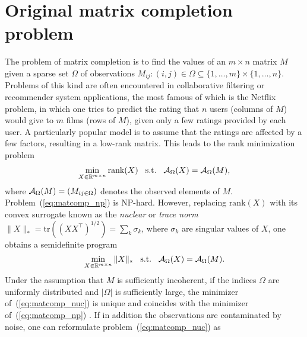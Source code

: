 \documentclass{article}
\begin{document}
\section{Original matrix completion problem}
\label{secMatCom}
\vspace{-0.2cm}
The problem of matrix completion is to find the values of an $m\times n$ matrix $M$ given a sparse set $\Omega$ of observations $M_{ij} : (i,j) \in \Omega \subseteq \{1,\hdots, m\} \times \{1, \hdots, n\}$. 
Problems of this kind are often encountered in collaborative filtering or recommender system applications, the most famous of which is the Netflix problem, in which one tries to predict the rating that $n$ users (columns of $M$) would give to $m$ films (rows of $M$), given only a few ratings provided by each user. 
A particularly popular model is to assume that the ratings are affected by a few factors, resulting in a low-rank matrix. 
This leads to the rank minimization problem 
\vspace{-0.1cm} 
\begin{eqnarray}
\min_{X \in \mathbb{R}^{m\times n}} 			 \text{rank}(X)   \hspace{3mm} \text{s.t.} \hspace{3mm} {\cal A}_{\Omega}(X) = {\cal A}_{\Omega}(M), 
\label{eq:matcomp_np}
\end{eqnarray}
where ${\cal A}_{\Omega}(M) = (M_{ij \in \Omega})$ denotes the observed elements of $M$. Problem~(\ref{eq:matcomp_np}) is NP-hard. However, replacing $\text{rank}(X)$ with its convex surrogate known as the {\em nuclear} or {\em trace norm} \cite{srebro2004maximum}  $\| X\|_* = \mathrm{tr}((XX^\top)^{1/2}) = \sum_{k} \sigma_k$, where $\sigma_k$ are singular values of $X$, one obtains a semidefinite program 
\vspace{-0.1cm}
\begin{eqnarray}
\min_{X \in \mathbb{R}^{m\times n}} 			 \|X\|_*    \hspace{3mm} \text{s.t.} \hspace{3mm} {\cal A}_{\Omega}(X) = {\cal A}_{\Omega}(M).  
\label{eq:matcomp_nuc}
\end{eqnarray}
Under the assumption that $M$ is sufficiently incoherent, if the indices $\Omega$ are uniformly distributed and $|\Omega|$ is sufficiently large, the minimizer of~(\ref{eq:matcomp_nuc}) is unique and coincides with the minimizer of~(\ref{eq:matcomp_np}) \cite{candes2009exact,recht2011simpler}. If in addition the observations are contaminated by noise, one can reformulate problem~(\ref{eq:matcomp_nuc}) as 
\end{document}
